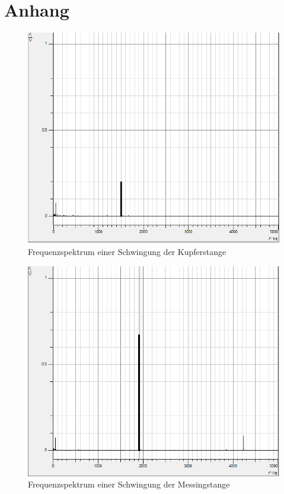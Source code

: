 \documentclass[a4paper, 11pt]{article}
\begin{document}
\section{Anhang}
\begin{figure}[H]
	\centering
	\includegraphics[scale=0.35]{../Kupfer.png}
	\caption{Frequenzspektrum einer Schwingung der Kupferstange}
	\label{fig:Kupfer}
\end{figure}
\begin{figure}[H]
	\centering
	\includegraphics[scale=0.35]{../Messing.png}
	\caption{Frequenzspektrum einer Schwingung der Messingstange}
	\label{fig:Messing}
\end{figure}
\end{document}
